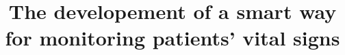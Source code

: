 \documentclass{bmcart}
\begin{document}
\begin{frontmatter}

\begin{fmbox}


\title{The developement of a smart way for monitoring patients' vital signs}


\author[ addressref={aff1}, email={michael187107@fci.bu.edu.eg}
]{ }

\author[ addressref={aff1}, email={samaa187070@fci.bu.edu.eg}
   ]{ }

   \author[ addressref={aff1}, email={ismail187006@fci.bu.edu.eg}
   ]{ }

\author[ addressref={aff1}, email={youssef187167@fci.bu.edu.eg}
]{ }

\author[ addressref={aff1}, email={mohamed187109@fci.bu.edu.eg}
]{ }


\address[id=aff1]{%
  , %
  ,                     %
  ,                              %
} 


\end{fmbox}
\end{frontmatter}
\end{document}

